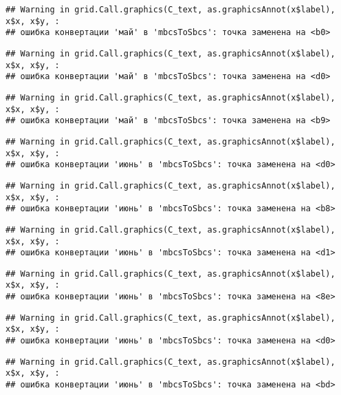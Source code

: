 \documentclass[
]{article}
\begin{document}
\begin{verbatim}
## Warning in grid.Call.graphics(C_text, as.graphicsAnnot(x$label), x$x, x$y, :
## ошибка конвертации 'май' в 'mbcsToSbcs': точка заменена на <b0>
\end{verbatim}

\begin{verbatim}
## Warning in grid.Call.graphics(C_text, as.graphicsAnnot(x$label), x$x, x$y, :
## ошибка конвертации 'май' в 'mbcsToSbcs': точка заменена на <d0>
\end{verbatim}

\begin{verbatim}
## Warning in grid.Call.graphics(C_text, as.graphicsAnnot(x$label), x$x, x$y, :
## ошибка конвертации 'май' в 'mbcsToSbcs': точка заменена на <b9>
\end{verbatim}

\begin{verbatim}
## Warning in grid.Call.graphics(C_text, as.graphicsAnnot(x$label), x$x, x$y, :
## ошибка конвертации 'июнь' в 'mbcsToSbcs': точка заменена на <d0>
\end{verbatim}

\begin{verbatim}
## Warning in grid.Call.graphics(C_text, as.graphicsAnnot(x$label), x$x, x$y, :
## ошибка конвертации 'июнь' в 'mbcsToSbcs': точка заменена на <b8>
\end{verbatim}

\begin{verbatim}
## Warning in grid.Call.graphics(C_text, as.graphicsAnnot(x$label), x$x, x$y, :
## ошибка конвертации 'июнь' в 'mbcsToSbcs': точка заменена на <d1>
\end{verbatim}

\begin{verbatim}
## Warning in grid.Call.graphics(C_text, as.graphicsAnnot(x$label), x$x, x$y, :
## ошибка конвертации 'июнь' в 'mbcsToSbcs': точка заменена на <8e>
\end{verbatim}

\begin{verbatim}
## Warning in grid.Call.graphics(C_text, as.graphicsAnnot(x$label), x$x, x$y, :
## ошибка конвертации 'июнь' в 'mbcsToSbcs': точка заменена на <d0>
\end{verbatim}

\begin{verbatim}
## Warning in grid.Call.graphics(C_text, as.graphicsAnnot(x$label), x$x, x$y, :
## ошибка конвертации 'июнь' в 'mbcsToSbcs': точка заменена на <bd>
\end{verbatim}
\end{document}
